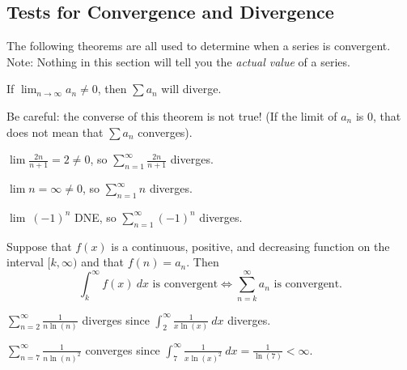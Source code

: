 \subsection{Tests for Convergence and Divergence}

The following theorems are all used to determine when a series is convergent. Note: Nothing in this section will tell you the \textit{actual value} of a series.


\begin{thm}
 If $\displaystyle \lim_{n\to\infty}a_n\neq 0$, then $\sum a_n$ will diverge.
\end{thm}
Be careful: the converse of this theorem is not true! (If the limit of $a_n$ is 0, that does not mean that $\sum a_n$ converges).

\begin{exampleblock}
$\lim\frac{2n}{n+1}=2\neq 0$, so $\displaystyle\sum_{n=1}^\infty \frac{2n}{n+1}$ diverges.
\end{exampleblock}

\begin{exampleblock}
$\lim n = \infty\neq 0$, so $\displaystyle\sum_{n=1}^\infty n$ diverges.
\end{exampleblock}

\begin{exampleblock}
$\lim\ (-1)^n$ DNE, so $\displaystyle\sum_{n=1}^\infty (-1)^n$ diverges.
\end{exampleblock}


\begin{thm}
Suppose that $f(x)$ is a continuous, positive, and decreasing function on the interval $[k,\infty)$ and that $f(n)=a_n$. Then
$$\int_k^\infty f(x)\ dx\text{ is convergent} \iff \sum_{n=k}^\infty a_n\text{ is convergent}.$$
\end{thm}

\begin{exampleblock}
$\displaystyle \sum_{n=2}^\infty \frac{1}{n\ln(n)}$ diverges since $\displaystyle\int_2^\infty \frac{1}{x\ln(x)}\ dx$ diverges.
\end{exampleblock}

\begin{exampleblock}
$\displaystyle \sum_{n=7}^\infty \frac{1}{n\ln(n)^2}$ converges since $\displaystyle\int_7^\infty \frac{1}{x\ln(x)^2}\ dx=\frac{1}{\ln(7)}<\infty$.
\end{exampleblock}


